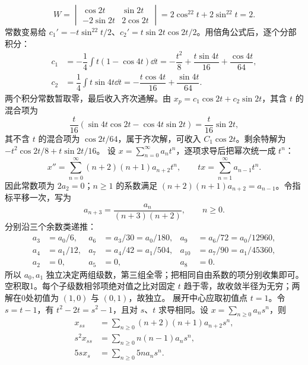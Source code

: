 \[
W=\begin{vmatrix}\cos2t&\sin2t\\-2\sin2t&2\cos2t\end{vmatrix}
=2\cos^22t+2\sin^22t=2.
\]
常数变易给 $c_1'=-t\sin^22t/2$、$c_2'=t\sin2t\cos2t/2$。用倍角公式后，逐个分部积分：
\[
\begin{aligned}
c_1&=-\dfrac14\int t(1-\cos4t)\dd t
=-\dfrac{t^2}{8}+\dfrac{t\sin4t}{16}+\dfrac{\cos4t}{64},\\
c_2&=\dfrac14\int t\sin4t\dd t
=-\dfrac{t\cos4t}{16}+\dfrac{\sin4t}{64}.
\end{aligned}
\]
两个积分常数暂取零，最后收入齐次通解。由 $x_p=c_1\cos2t+c_2\sin2t$，其含 $t$ 的混合项为
\[
\dfrac t{16}(\sin4t\cos2t-\cos4t\sin2t)=\dfrac t{16}\sin2t,
\]
其不含 $t$ 的混合项为 $\cos2t/64$，属于齐次解，可收入 $C_1\cos2t$。剩余特解为 $-t^2\cos2t/8+t\sin2t/16$。
设 $x=\sum_{n=0}^\infty a_nt^n$，逐项求导后把幂次统一成 $t^n$：
\[
x''=\sum_{n=0}^\infty(n+2)(n+1)a_{n+2}t^n,
\qquad tx=\sum_{n=1}^\infty a_{n-1}t^n.
\]
因此常数项为 $2a_2=0$；$n\ge1$ 的系数满足 $(n+2)(n+1)a_{n+2}=a_{n-1}$。令指标平移一次，写为
\[
a_{n+3}=\dfrac{a_n}{(n+3)(n+2)},\qquad n\ge0.
\]
分别沿三个余数类递推：
\[
\begin{aligned}
a_3&=a_0/6,&a_6&=a_3/30=a_0/180,&a_9&=a_6/72=a_0/12960,\\
a_4&=a_1/12,&a_7&=a_4/42=a_1/504,&a_{10}&=a_7/90=a_1/45360,\\
a_2&=0,&a_5&=0,&a_8&=0.
\end{aligned}
\]
所以 $a_0,a_1$ 独立决定两组级数，第三组全零；把相同自由系数的项分别收集即可。
空积取1。每个子级数相邻项绝对值之比对固定 $t$ 趋于零，故收敛半径为无穷；两解在0处初值为 $(1,0)$ 与 $(0,1)$，故独立。
展开中心应取初值点 $t=1$。令 $s=t-1$，有 $t^2-2t=s^2-1$，且对 $s$、$t$ 求导相同。设 $x=\sum_{n\ge0}a_ns^n$，则
\[
\begin{aligned}
x_{ss}&=\sum_{n\ge0}(n+2)(n+1)a_{n+2}s^n,\\
s^2x_{ss}&=\sum_{n\ge0}n(n-1)a_ns^n,\\
5sx_s&=\sum_{n\ge0}5na_ns^n.
\end{aligned}
\]
